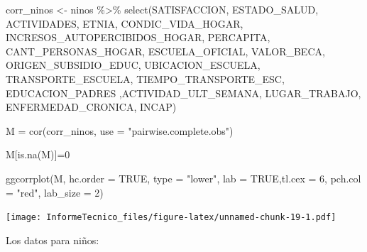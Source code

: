 \documentclass[
]{article}
\newenvironment{Shaded}{\begin{snugshade}}{\end{snugshade}}
\newcommand{\AttributeTok}[1]{\textcolor[rgb]{0.77,0.63,0.00}{#1}}
\newcommand{\ConstantTok}[1]{\textcolor[rgb]{0.00,0.00,0.00}{#1}}
\newcommand{\DecValTok}[1]{\textcolor[rgb]{0.00,0.00,0.81}{#1}}
\newcommand{\FunctionTok}[1]{\textcolor[rgb]{0.00,0.00,0.00}{#1}}
\newcommand{\NormalTok}[1]{#1}
\newcommand{\OtherTok}[1]{\textcolor[rgb]{0.56,0.35,0.01}{#1}}
\newcommand{\SpecialCharTok}[1]{\textcolor[rgb]{0.00,0.00,0.00}{#1}}
\newcommand{\StringTok}[1]{\textcolor[rgb]{0.31,0.60,0.02}{#1}}
\begin{document}
\begin{Shaded}
\begin{Highlighting}[]
\NormalTok{corr\_ninos }\OtherTok{\textless{}{-}}\NormalTok{ ninos }\SpecialCharTok{\%\textgreater{}\%} \FunctionTok{select}\NormalTok{(SATISFACCION, ESTADO\_SALUD, ACTIVIDADES, ETNIA, }
\NormalTok{                               CONDIC\_VIDA\_HOGAR, INCRESOS\_AUTOPERCIBIDOS\_HOGAR,}
\NormalTok{                               PERCAPITA, CANT\_PERSONAS\_HOGAR, ESCUELA\_OFICIAL,}
\NormalTok{                               VALOR\_BECA, ORIGEN\_SUBSIDIO\_EDUC, UBICACION\_ESCUELA, }
\NormalTok{                               TRANSPORTE\_ESCUELA, TIEMPO\_TRANSPORTE\_ESC, }
\NormalTok{                               EDUCACION\_PADRES ,ACTIVIDAD\_ULT\_SEMANA, }
\NormalTok{                               LUGAR\_TRABAJO, ENFERMEDAD\_CRONICA, INCAP)}

\NormalTok{M }\OtherTok{=} \FunctionTok{cor}\NormalTok{(corr\_ninos, }\AttributeTok{use =} \StringTok{"pairwise.complete.obs"}\NormalTok{)}

\NormalTok{M[}\FunctionTok{is.na}\NormalTok{(M)]}\OtherTok{=}\DecValTok{0}

\FunctionTok{ggcorrplot}\NormalTok{(M, }\AttributeTok{hc.order =} \ConstantTok{TRUE}\NormalTok{, }\AttributeTok{type =} \StringTok{"lower"}\NormalTok{, }\AttributeTok{lab =} \ConstantTok{TRUE}\NormalTok{,}\AttributeTok{tl.cex =} \DecValTok{6}\NormalTok{, }
            \AttributeTok{pch.col =} \StringTok{"red"}\NormalTok{, }\AttributeTok{lab\_size =} \DecValTok{2}\NormalTok{)}
\end{Highlighting}
\end{Shaded}

\texttt{[image: InformeTecnico\_files/figure-latex/unnamed-chunk-19-1.pdf]}

Los datos para niños:
\end{document}
